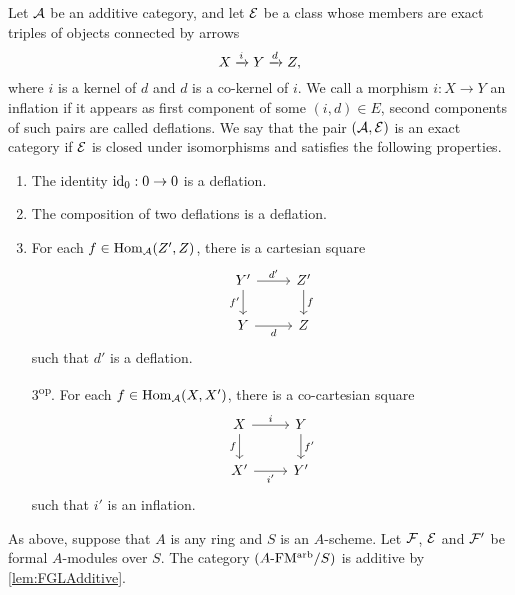 \documentclass[../main.tex]{subfiles}
\begin{document}
\begin{defi}
  Let $\mathcal{A}$ be an additive category, and let $\mathcal{E}$ be a class whose
  members are exact triples of objects connected by arrows 
  \begin{equation*}
    X \xrightarrow{i} Y \xrightarrow{d} Z,
  \end{equation*}
  where $i$ is a kernel of $d$ and $d$ is a co-kernel of $i$. 
  We call a morphism $i:X \to Y$ an inflation if it appears as first component
  of some $(i,d) \in E$, second components of such pairs are called deflations.
  We say that the pair $(\mathcal{A}, \mathcal{E})$ is an exact category if 
  $\mathcal{E}$ is closed under isomorphisms and satisfies the following properties.
  \begin{enumerate}
    \item The identity $\operatorname{id}_0: 0 \to 0$ is a deflation.
    \item The composition of two deflations is a deflation.
    \item For each $f \in \operatorname{Hom}_{\mathcal{A}}(Z', Z)$, there is a cartesian square
    \begin{equation*}
        \begin{tikzcd}[ampersand replacement=\&]
        	{Y'} \& {Z'} \\
        	Y \& Z
        	\arrow["{d'}", from=1-1, to=1-2]
        	\arrow["{f'}"', from=1-1, to=2-1]
        	\arrow["f", from=1-2, to=2-2]
        	\arrow["d"', from=2-1, to=2-2]
        \end{tikzcd}
    \end{equation*}
    such that $d'$ is a deflation.
  \item[3\textsuperscript{op}.] For each $f \in \operatorname{Hom}_{\mathcal{A}}(X, X')$, there is a
    co-cartesian square
      \begin{equation*}
        \begin{tikzcd}[ampersand replacement=\&]
        	X \& Y \\
        	{X'} \& {Y'}
        	\arrow["i", from=1-1, to=1-2]
        	\arrow["f"', from=1-1, to=2-1]
        	\arrow["{f'}", from=1-2, to=2-2]
        	\arrow["{i'}"', from=2-1, to=2-2]
        \end{tikzcd}
      \end{equation*}
      such that $i'$ is an inflation.
  \end{enumerate}
\end{defi}

As above, suppose that $A$ is any ring and $S$ is an $A$-scheme. Let $\mathcal{F}$, $\mathcal{E}$ and $\mathcal{F}'$ be formal $A$-modules
over $S$. The category ${({A}\textnormal-\allowbreak\mathrm{FM^{arb}}/{S})}$ is additive by \cref{lem:FGLAdditive}.
\end{document}
